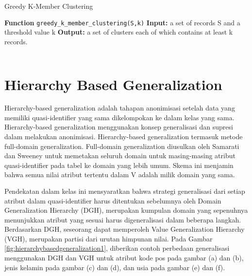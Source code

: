 \begin{algorithm}[H]
  \caption{Greedy K-Member Clustering}\label{euclid}

  \begin{algorithmic}[1]
  \State \textbf{Function} \texttt{greedy\_k\_member\_clustering(S,k)}
  \State \textbf{Input:} a set of records S and a threshold value k
  \State \textbf{Output:} a set of clusters each of which contains at least k records.
  \\
  \EndIf
  \\
  	\EndWhile
  \EndWhile
  \EndWhile
  \end{algorithmic}
\end{algorithm}



\section{Hierarchy Based Generalization} 


Hierarchy-based generalization adalah tahapan anonimisasi setelah data yang memiliki quasi-identifier yang sama dikelompokan ke dalam kelas yang sama. Hierarchy-based generalization menggunakan konsep generalisasi dan supresi dalam melakukan anonimisasi. Hierarchy-based generalization termasuk metode full-domain generalization. Full-domain generalization diusulkan oleh Samarati dan Sweeney untuk memetakan seluruh domain untuk masing-masing atribut quasi-identifier pada tabel ke domain yang lebih umum. Skema ini menjamin bahwa semua nilai atribut tertentu dalam V adalah milik domain yang sama. 

\par Pendekatan dalam kelas ini mensyaratkan bahwa strategi generalisasi dari setiap atribut dalam quasi-identifier harus ditentukan sebelumnya oleh Domain Generalization Hierarchy (DGH), merupakan kumpulan domain yang sepenuhnya menunjukkan atribut yang sesuai harus digeneralisasi dalam beberapa langkah. Berdasarkan DGH, seseorang dapat memperoleh Value Generalization Hierarchy (VGH), merupakan partisi dari urutan himpunan nilai. Pada Gambar \ref{fig:hierarchybasedgeneralization1}, diberikan contoh perbedaan generalisasi menggunakan DGH dan VGH untuk atribut kode pos pada gambar (a) dan (b), jenis kelamin pada gambar (c) dan (d), dan usia pada gambar (e) dan (f).

